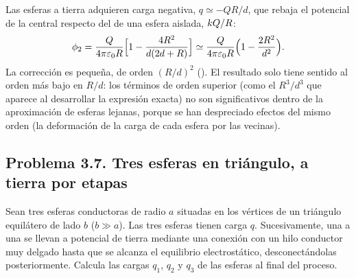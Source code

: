 

\begin{observacion}\label{obs:sem-alineadas}
Las esferas a tierra adquieren carga negativa, $q\simeq-QR/d$, que rebaja el potencial de la central respecto del de una esfera aislada, $k Q/R$:
\[
  \phi_2=\frac{Q}{4\pi\varepsilon_{0} R}\Bigl[1-\frac{4R^{2}}{d(2d+R)}\Bigr]\simeq\frac{Q}{4\pi\varepsilon_{0} R}\Bigl(1-\frac{2R^{2}}{d^{2}}\Bigr).
\]
La corrección es pequeña, de orden $(R/d)^{2}$ (). El resultado solo tiene sentido al orden más bajo en $R/d$: los términos de orden
superior (como el $R^{3}/d^{3}$ que aparece al desarrollar la expresión exacta) no son significativos dentro de la aproximación de esferas lejanas, porque se
han despreciado efectos del mismo orden (la deformación de la carga de cada esfera por las vecinas).
\end{observacion}

\subsection{Problema 3.7. Tres esferas en triángulo, a tierra por etapas}\label{sem:triangulo}
\begin{problema}\label{prob:triangulo}
Sean tres esferas conductoras de radio $a$ situadas en los vértices de un triángulo equilátero de lado $b$ ($b\gg a$). Las tres esferas tienen carga $q$.
Sucesivamente, una a una se llevan a potencial de tierra mediante una conexión con un hilo conductor muy delgado hasta que se alcanza el equilibrio
electrostático, desconectándolas posteriormente. Calcula las cargas $q_1$, $q_2$ y $q_3$ de las esferas al final del proceso.
\end{problema}

